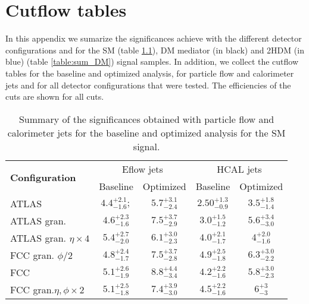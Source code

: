 
\chapter{Cutflow tables}
\label{chapter:cutflows}
In this appendix we sumarize the significances achieve with the different detector configurations and for the SM (table \ref{table:sum_SM}), DM mediator (in black) and 2HDM (in blue) (table \ref{table:sum_DM}) signal samples. In addition, we collect the cutflow tables for the baseline and optimized analysis, for particle flow and calorimeter jets and for all detector configurations that were tested. The efficiencies of the cuts are shown for all cuts.

\begin{table}[h]
	\caption{Summary of the significances obtained with particle flow and calorimeter jets for the baseline and optimized analysis for the SM signal.}
	\label{table:sum_SM}
	\centering
	\begin{tabular}{lcccc}
		\hline
		 \multirow{2}{*}{\textbf{Configuration}} & \multicolumn{2}{c}{Eflow jets}    & \multicolumn{2}{c}{HCAL jets} \\ \cline{2-5} 
		& Baseline & Optimized & Baseline  & Optimized           \\ \midrule \midrule
		ATLAS& $4.4^{+2.1}_{-1.6};$ & $5.7^{+3.1}_{-2.4}$ & $2.50^{+1.3}_{-0.9}$ & $3.5^{+1.8}_{-1.4}$\\ 
		\rowcolor{black!7}ATLAS gran.& $4.6^{+2.3}_{-1.6}$ & $7.5^{+3.7}_{-2.9}$ & $3.0^{+1.5}_{-1.2}$ & $5.6^{+3.4}_{-3.0}$ \\ 
		ATLAS gran. $\eta\times 4$& $5.4^{+2.7}_{-2.0}$ & $6.1^{+3.0}_{-2.3}$ & $4.0^{+2.1}_{-1.7}$ & $4^{+2.0}_{-1.6}$ \\ 
		\rowcolor{black!7}FCC gran. $\phi/2$& $4.8^{+2.4}_{-1.7}$ & $7.5^{+3.7}_{-2.8}$ & $4.9^{+2.5}_{-1.8}$ & $6.3^{+3.0}_{-2.2}$\\ 
		FCC& $5.1^{+2.6}_{-1.9}$ & $8.8^{+4.4}_{-3.4}$ & $4.2^{+2.2}_{-1.6}$ & $5.8^{+3.0}_{-2.3}$ \\ 
		\rowcolor{black!7}FCC gran.$\eta,\phi \times 2$& $5.1^{+2.5}_{-1.8}$ & $7.4^{+3.9}_{-3.0}$ &  $4.5^{+2.2}_{-1.6}$& $6^{+3}_{-3}$ \\ \bottomrule
	\end{tabular}
	
\end{table}

